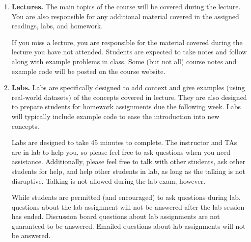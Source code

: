 \documentclass[11pt]{article}
\begin{document}
\begin{enumerate}
\item {\bf Lectures.} The main topics of the course will be covered during the lecture.  You are also responsible for any additional material covered in the assigned readings, labs, and homework.  

If you miss a lecture, you are responsible for the material covered during the lecture you have not attended. %
Students are expected to take notes and follow along with example problems in class.  Some (but not all) course notes and example code will be posted on the course website.



\item {\bf Labs.}  Labs are specifically designed to add context and give examples (using real-world datasets) of the concepts covered in lecture.  They are also designed to prepare students for homework assignments due the following week.  Labs will typically include example code to ease the introduction into new concepts.

Labs are designed to take 45 minutes to complete.  The instructor and TAs are in lab to help you, so please feel free to ask questions when you need assistance.  Additionally, please feel free to talk with other students, ask other students for help, and help other students in lab, as long as the talking is not disruptive.  Talking is not allowed during the lab exam, however. 

While students are permitted (and encouraged) to ask questions during lab, questions about the lab assignment will not be answered after the lab session has ended.  Discussion board questions about lab assignments are not guaranteed to be answered.  Emailed questions about lab assignments will not be answered. 


\end{enumerate}
\end{document}
